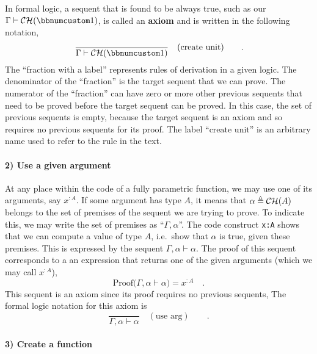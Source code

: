 In formal logic, a sequent that is found to be always true, such as
our $\Gamma\vdash{\cal CH}(\bbnum 1)$, is called an \textbf{axiom}
and is written in the following notation,
\[
\frac{}{\Gamma\vdash{\cal CH}(\bbnum 1)}\quad(\text{create unit})\quad\quad.
\]
The ``fraction with a label'' represents rules of derivation in
a given logic. The denominator of the ``fraction'' is the target
sequent that we can prove. The numerator of the ``fraction'' can
have zero or more other previous sequents that need to be proved before
the target sequent can be proved. In this case, the set of previous
sequents is empty, because the target sequent is an axiom and so requires
no previous sequents for its proof. The label ``$\text{create unit}$''
is an arbitrary name used to refer to the rule in the text.

\paragraph{2) Use a given argument}

At any place within the code of a fully parametric function, we may
use one of its arguments, say $x^{:A}$. If some argument has type
$A$, it means that $\alpha\triangleq{\cal CH}(A)$ belongs to the
set of premises of the sequent we are trying to prove. To indicate
this, we may write the set of premises as ``$\Gamma,\alpha$''.
The code construct \lstinline!x:A!
shows that we can compute a value of type $A$, i.e.~show that $\alpha$
is true, given these premises. This is expressed by the sequent $\Gamma,\alpha\vdash\alpha$.
The proof of this sequent corresponds to a an expression that returns
one of the given arguments (which we may call $x^{:A}$),
\[
\text{Proof}\big(\Gamma,\alpha\vdash\alpha\big)=x^{:A}\quad.
\]
This sequent is an axiom since its proof requires no previous sequents,
The formal logic notation for this axiom is
\[
\frac{~}{\Gamma,\alpha\vdash\alpha}\quad(\text{use arg})\quad\quad.
\]


\paragraph{3) Create a function}

